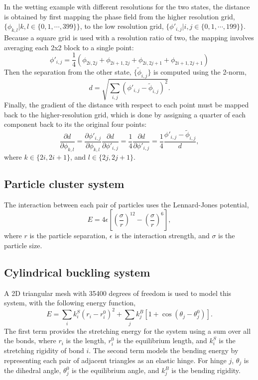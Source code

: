 \documentclass[twocolumn,10pt]{revtex4-2}
\begin{document}
In the wetting example with different resolutions for the two states, the distance is obtained by first mapping the phase field from the higher resolution grid, $\{\phi_{k,l} | k,l \in \{0,1,\cdots,399\}\}$, to the low resolution grid, $\{\phi'_{i,j} | i,j \in \{0,1,\cdots,199\}\}$.
Because a square grid is used with a resolution ratio of two, the mapping involves averaging each 2x2 block to a single point:
\begin{equation}
  \phi'_{i,j} = \frac{1}{4} \left( \phi_{2i,2j} + \phi_{2i+1,2j} + \phi_{2i,2j+1} + \phi_{2i+1,2j+1} \right)
\end{equation}
Then the separation from the other state, $\{\widetilde{\phi}_{i,j}\}$ is computed using the 2-norm,
\begin{equation}
  d = \sqrt{\sum_{i,j} \left( \phi'_{i,j} - \widetilde{\phi}_{i,j} \right)^2}.
\end{equation}
Finally, the gradient of the distance with respect to each point must be mapped back to the higher-resolution grid, which is done by assigning a quarter of each component back to its the original four points:
\begin{equation}
  \frac{\partial d}{\partial \phi_{k,l}} =
    \frac{\partial \phi'_{i,j}}{\partial \phi_{k,l}} \frac{\partial d}{\partial \phi'_{i,j}} =
    \frac{1}{4} \frac{\partial d}{\partial \phi'_{i,j}} =
    \frac{1}{4} \frac{\phi'_{i,j} - \widetilde{\phi}_{i,j}}{d},
\end{equation}
where $k \in \{2i, 2i+1\}$, and $l \in \{2j, 2j+1\}$.

\subsection{Particle cluster system}
The interaction between each pair of particles uses the Lennard-Jones potential,
\begin{equation}
  E = 4\epsilon \left[ \left(\frac{\sigma}{r}\right)^{12} - \left(\frac{\sigma}{r}\right)^6 \right],
\end{equation}
where $r$ is the particle separation, $\epsilon$ is the interaction strength, and $\sigma$ is the particle size.

\subsection{Cylindrical buckling system}
A 2D triangular mesh with 35400 degrees of freedom is used to model this system, with the following energy function,
\begin{equation}
  E = \sum_i k^S_i (r_i - r^0_i)^2 + \sum_j k^B_j [1 + \cos(\theta_j - \theta^0_j)].
\end{equation}
The first term provides the stretching energy for the system using a sum over all the bonds, where $r_i$ is the length, $r^0_i$ is the equilibrium length, and $k^S_i$ is the stretching rigidity of bond $i$.
The second term models the bending energy by representing each pair of adjacent triangles as an elastic hinge.
For hinge $j$, $\theta_j$ is the dihedral angle, $\theta^0_j$ is the equilibrium angle, and $k^B_j$ is the bending rigidity.
\end{document}
